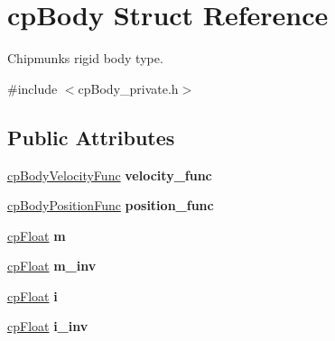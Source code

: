 \hypertarget{structcp_body}{}\section{cp\+Body Struct Reference}
\label{structcp_body}


Chipmunk\textquotesingle{}s rigid body type.  




{\ttfamily \#include $<$cp\+Body\+\_\+private.\+h$>$}

\subsection*{Public Attributes}
\begin{DoxyCompactItemize}
\item 
\hypertarget{structcp_body_adc333a0be0d7953cad1fb4f6ee49dcf6}{}\hyperlink{group__cp_body_gaa7a1f4706fb8e879c356ae99035ead71}{cp\+Body\+Velocity\+Func} {\bfseries velocity\+\_\+func}\label{structcp_body_adc333a0be0d7953cad1fb4f6ee49dcf6}

\item 
\hypertarget{structcp_body_a7da3dcd9ac7c689a1da1f97b37c292b9}{}\hyperlink{group__cp_body_ga3386e3b0b4156289ab6099cc64c952e7}{cp\+Body\+Position\+Func} {\bfseries position\+\_\+func}\label{structcp_body_a7da3dcd9ac7c689a1da1f97b37c292b9}

\item 
\hypertarget{structcp_body_a883298164e53e4633b3daa4de92a9831}{}\hyperlink{group__basic_types_gac1ed65573e035bf892505768c852d8d3}{cp\+Float} {\bfseries m}\label{structcp_body_a883298164e53e4633b3daa4de92a9831}

\item 
\hypertarget{structcp_body_a204a010e411c0f67e511a69f23d02025}{}\hyperlink{group__basic_types_gac1ed65573e035bf892505768c852d8d3}{cp\+Float} {\bfseries m\+\_\+inv}\label{structcp_body_a204a010e411c0f67e511a69f23d02025}

\item 
\hypertarget{structcp_body_a4a47d0b30594a5fe28dd4de3cdf1450a}{}\hyperlink{group__basic_types_gac1ed65573e035bf892505768c852d8d3}{cp\+Float} {\bfseries i}\label{structcp_body_a4a47d0b30594a5fe28dd4de3cdf1450a}

\item 
\hypertarget{structcp_body_a36b73e662173a240d1d8f09cdd468202}{}\hyperlink{group__basic_types_gac1ed65573e035bf892505768c852d8d3}{cp\+Float} {\bfseries i\+\_\+inv}\label{structcp_body_a36b73e662173a240d1d8f09cdd468202}


\end{DoxyCompactItemize}
